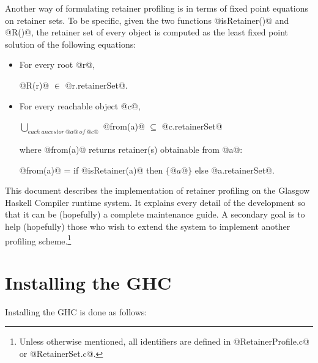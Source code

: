 \documentclass{article}
\begin{document}
Another way of formulating retainer profiling is in terms of fixed point
equations on retainer sets.
To be specific, given the two functions @isRetainer()@ and @R()@,
the retainer set of every object is computed as the least fixed point
solution of the following equations:
\begin{itemize}
\item For every root @r@, 
\begin{center}
  @R(r)@ $\in$ @r.retainerSet@.
\end{center}
\item For every reachable object @c@, 
\begin{center}
$\bigcup_{\mathit{each\ ancestor\ @a@\ of\ @c@}}$ @from(a)@ $\subseteq$ 
@c.retainerSet@ 
\end{center}
where @from(a)@ returns retainer(s) obtainable from @a@:
\begin{center}
@from(a)@ = if @isRetainer(a)@ then $\{@a@\}$ else @a.retainerSet@.
\end{center}
\end{itemize}

This document describes the implementation of retainer profiling on
the Glasgow Haskell Compiler runtime system. 
It explains every detail of the development so that it can be (hopefully)
a complete maintenance guide.
A secondary goal is to help (hopefully) those who wish to extend the system 
to implement another profiling scheme.\footnote{Unless otherwise mentioned,
all identifiers are defined in @RetainerProfile.c@ or @RetainerSet.c@.}

\section{Installing the GHC}

Installing the GHC is done as follows:
\end{document}
